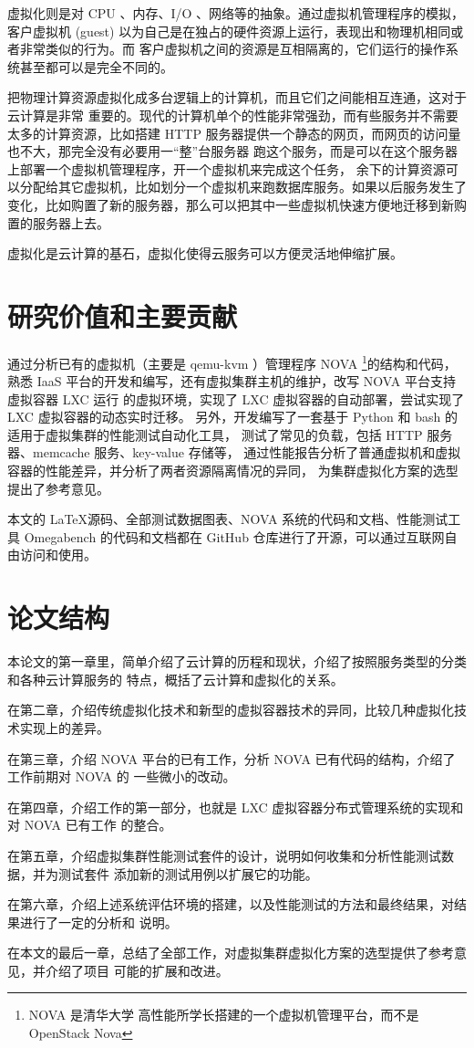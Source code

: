 虚拟化则是对 CPU 、内存、I/O 、网络等的抽象。通过虚拟机管理程序的模拟，客户虚拟机
(guest) 以为自己是在独占的硬件资源上运行，表现出和物理机相同或者非常类似的行为。而
客户虚拟机之间的资源是互相隔离的，它们运行的操作系统甚至都可以是完全不同的。

把物理计算资源虚拟化成多台逻辑上的计算机，而且它们之间能相互连通，这对于云计算是非常
重要的。现代的计算机单个的性能非常强劲，而有些服务并不需要太多的计算资源，比如搭建
HTTP 服务器提供一个静态的网页，而网页的访问量也不大，那完全没有必要用一“整”台服务器
跑这个服务，而是可以在这个服务器上部署一个虚拟机管理程序，开一个虚拟机来完成这个任务，
余下的计算资源可以分配给其它虚拟机，比如划分一个虚拟机来跑数据库服务。如果以后服务发生了
变化，比如购置了新的服务器，那么可以把其中一些虚拟机快速方便地迁移到新购置的服务器上去。

虚拟化是云计算的基石，虚拟化使得云服务可以方便灵活地伸缩扩展。

\section{研究价值和主要贡献}

通过分析已有的虚拟机（主要是 qemu-kvm ）管理程序 NOVA \footnote{NOVA 是清华大学
高性能所学长搭建的一个虚拟机管理平台，而不是 OpenStack Nova }的结构和代码，熟悉
IaaS 平台的开发和编写，还有虚拟集群主机的维护，改写 NOVA 平台支持虚拟容器 LXC 运行
的虚拟环境，实现了 LXC 虚拟容器的自动部署，尝试实现了 LXC 虚拟容器的动态实时迁移。
另外，开发编写了一套基于 Python 和 bash 的适用于虚拟集群的性能测试自动化工具，
测试了常见的负载，包括 HTTP 服务器、memcache 服务、key-value 存储等，
通过性能报告分析了普通虚拟机和虚拟容器的性能差异，并分析了两者资源隔离情况的异同，
为集群虚拟化方案的选型提出了参考意见。

本文的 \LaTeX 源码、全部测试数据图表、NOVA 系统的代码和文档、性能测试工具 Omegabench
的代码和文档都在 GitHub 仓库进行了开源，可以通过互联网自由访问和使用。

\section{论文结构}

本论文的第一章里，简单介绍了云计算的历程和现状，介绍了按照服务类型的分类和各种云计算服务的
特点，概括了云计算和虚拟化的关系。

在第二章，介绍传统虚拟化技术和新型的虚拟容器技术的异同，比较几种虚拟化技术实现上的差异。

在第三章，介绍 NOVA 平台的已有工作，分析 NOVA 已有代码的结构，介绍了工作前期对 NOVA 的
一些微小的改动。

在第四章，介绍工作的第一部分，也就是 LXC 虚拟容器分布式管理系统的实现和对 NOVA 已有工作
的整合。

在第五章，介绍虚拟集群性能测试套件的设计，说明如何收集和分析性能测试数据，并为测试套件
添加新的测试用例以扩展它的功能。

在第六章，介绍上述系统评估环境的搭建，以及性能测试的方法和最终结果，对结果进行了一定的分析和
说明。

在本文的最后一章，总结了全部工作，对虚拟集群虚拟化方案的选型提供了参考意见，并介绍了项目
可能的扩展和改进。
